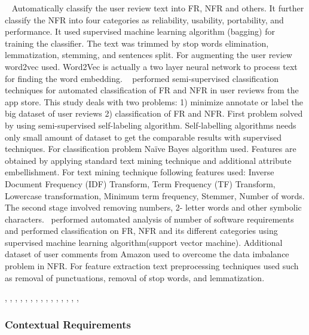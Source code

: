  \etal~\cite{} Automatically classify the user
review text into FR, NFR and others. It further classify the NFR into four
categories as reliability, usability, portability, and performance. It used
supervised machine learning algorithm (bagging) for training the classifier. The
text was trimmed by stop words elimination, lemmatization, stemming, and
sentences split. For augmenting the user review word2vec used.
Word2Vec is actually a two layer neural network to process text for finding the
word embedding.  \etal~\cite {Deocadez:2017}
performed semi-supervised classification techniques for automated classification
of FR and NFR in user reviews from the app store. This study deals with two
problems: 1) minimize annotate or label the big dataset of user reviews 2)
classification of FR and NFR. First problem solved by using semi-supervised
self-labeling algorithm. Self-labelling algorithms needs only small amount of
dataset to get the comparable results with supervised techniques. For
classification problem Naïve Bayes algorithm used. Features are obtained by
applying standard text mining technique and additional attribute embellishment.
For text mining technique following features used:  Inverse Document Frequency
(IDF)
Transform, Term Frequency (TF) Transform, Lowercase transformation, Minimum term
frequency, Stemmer, Number of words. The second stage involved removing numbers,
2- letter words and other symbolic
characters.\etal~\cite{Kurtanovic:2017} performed automated analysis of number
of software requirements and performed classification on FR, NFR and its different
categories using supervised machine learning algorithm(support vector machine).
Additional dataset of user comments from Amazon used to overcome the data
imbalance problem in NFR. For feature extraction text preprocessing techniques
used such as removal of punctuations, removal of stop words, and lemmatization.

\cite{Deocadez:2017}, \cite{Kurtanovic:2017}, \cite{Guzman:2017},
\cite{Abad:2017}, \cite{Dekhtyar:2017}, \cite{Rashwan:2012}, \cite{Lu:2017},
\cite{Hayes:2014}, \cite{Williams:2017}, \cite{Garzoli:2013},
\cite{Casamayor:2010}, \cite{Wang:2016}, \cite{Hussain:2012}, \cite{Jiang:2014},
\cite{Jha:2017}, \cite{Pinquie:2015}



\subsubsection{Contextual Requirements} 

